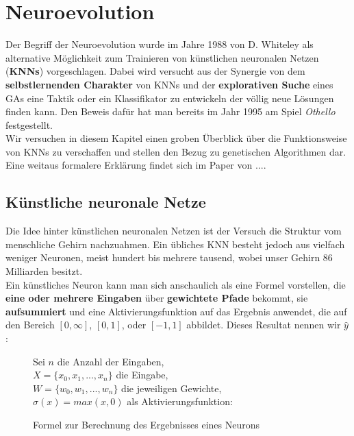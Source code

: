     \section{Neuroevolution}
        Der Begriff der Neuroevolution wurde im Jahre 1988 von D. Whiteley \cite{whiteley88} als alternative Möglichkeit zum Trainieren von künstlichen neuronalen Netzen (\textbf{KNNs}) vorgeschlagen. Dabei wird versucht aus der Synergie von dem \textbf{selbstlernenden Charakter} von KNNs und der \textbf{explorativen Suche} eines GAs eine Taktik oder ein Klassifikator zu entwickeln der völlig neue Lösungen finden kann. Den Beweis dafür hat man bereits im Jahr 1995 am Spiel \textit{Othello} festgestellt. \cite{othello95} \\[2mm]
        \noindent
        Wir versuchen in diesem Kapitel einen groben Überblick über die Funktionsweise von KNNs zu verschaffen und stellen den Bezug zu genetischen Algorithmen dar. Eine weitaus formalere Erklärung findet sich im Paper von ....

        \subsection{Künstliche neuronale Netze}

            Die Idee hinter künstlichen neuronalen Netzen ist der Versuch die Struktur vom menschliche Gehirn nachzuahmen. Ein übliches KNN besteht jedoch aus vielfach weniger Neuronen, meist hundert bis mehrere tausend, wobei unser Gehirn 86 Milliarden\cite{brainsize} besitzt.\\
            \noindent
            Ein künstliches Neuron kann man sich anschaulich als eine Formel vorstellen, die \textbf{eine oder mehrere Eingaben} über \textbf{gewichtete Pfade} bekommt, sie \textbf{aufsummiert} und eine Aktivierungsfunktion auf das Ergebnis anwendet, die auf den Bereich $[0,\infty]$, $[0,1]$, oder $[-1,1]$ abbildet. Dieses Resultat nennen wir $\hat{y}$:

            \begin{figure}[H]
                \begin{mdframed}
                    \noindent
                    Sei $n$ die Anzahl der Eingaben,\\
                    \hspace*{4.5mm}    $X = \{x_0,x_1,...,x_n\}$ die Eingabe,\\
                    \hspace*{4.5mm}    $W = \{w_0, w_1,...,w_n\}$ die jeweiligen Gewichte, \\
                    \hspace*{4.5mm}    $\sigma(x) = max(x,0)$ als Aktivierungsfunktion:\\[4mm]
                    \hspace*{50mm} 
                \end{mdframed}
                \caption{\label{neuron-math} Formel zur Berechnung des Ergebnisses eines Neurons}
            \end{figure}

